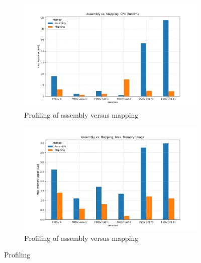 \begin{figure}[ht]
    \centering
	\begin{subfigure}[b]{1.1\textwidth}
        \includegraphics[width=1.0\textwidth]{media/4-profiling-cputime.png}
        \caption{Profiling of assembly versus mapping}
        \label{fig:4-profiling-cpu}
    \end{subfigure}
    \medskip
	\begin{subfigure}[b]{1.1\textwidth}
        \includegraphics[width=1.0\textwidth]{media/4-profiling-maxmem.png}
        \caption{Profiling of assembly versus mapping}
        \label{fig:4-profiling-meem}
    \end{subfigure}
    \caption{Profiling}
\end{figure}
